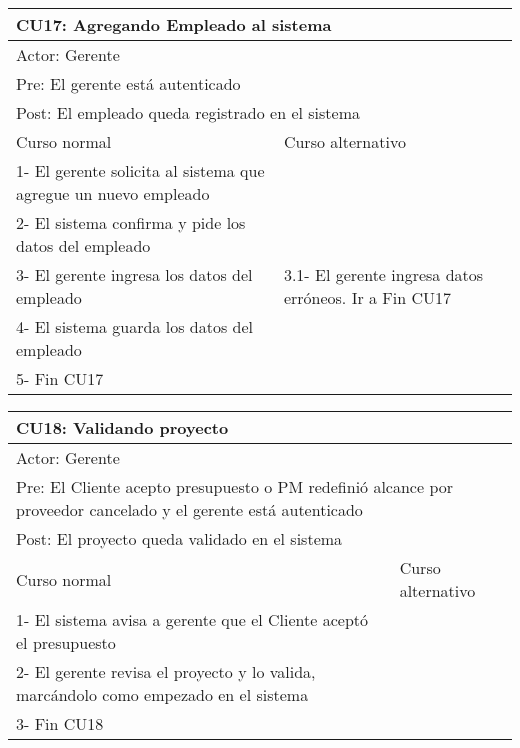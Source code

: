 \begin{table}[H]
  \begin{adjustbox}{max width = \textwidth}
  \begin{tabular}{|l|l|}
    \hline
    \multicolumn{2}{|l|}{CU17: Agregando Empleado al sistema} \\\hline
    \multicolumn{2}{|l|}{Actor: Gerente} \\\hline
    \multicolumn{2}{|l|}{Pre: El gerente está autenticado} \\\hline
    \multicolumn{2}{|l|}{Post: El empleado queda registrado en el sistema} \\\hline
     Curso normal & Curso alternativo\\ \hline
	 1- El gerente solicita al sistema que agregue un nuevo empleado & \\ \hline
	 2- El sistema confirma y pide los datos del empleado & \\ \hline
	 3- El gerente ingresa los datos del empleado & 3.1- El gerente ingresa datos erróneos. Ir a Fin CU17\\ \hline
   4- El sistema guarda los datos del empleado & \\ \hline
   5- Fin CU17 & \\ \hline
  \end{tabular}
  \end{adjustbox}
\end{table}

\begin{table}[H]
  \begin{adjustbox}{max width = \textwidth}
  \begin{tabular}{|l|l|}
    \hline
    \multicolumn{2}{|l|}{CU18: Validando proyecto} \\\hline
    \multicolumn{2}{|l|}{Actor: Gerente} \\\hline
    \multicolumn{2}{|l|}{Pre: El Cliente acepto presupuesto o PM redefinió alcance por proveedor cancelado y el gerente está autenticado} \\\hline
    \multicolumn{2}{|l|}{Post: El proyecto queda validado en el sistema} \\\hline
     Curso normal & Curso alternativo\\ \hline
	 1- El sistema avisa a gerente que el Cliente aceptó el presupuesto & \\ \hline
	 2- El gerente revisa el proyecto y lo valida, marcándolo como empezado en el sistema & \\ \hline
   3- Fin CU18 & \\ \hline
  \end{tabular}
  \end{adjustbox}
\end{table}

